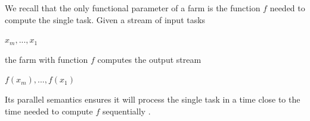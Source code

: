 


We recall that the only functional parameter of a farm is the function \(f\) needed to compute the single task.
Given a stream of input tasks
\begin{center}
	\(x_m , . . . , x_1\)\\
\end{center}
the farm with function \(f\) computes the output stream
\begin{center}
	\(f ( x_m ), . . . , f ( x_1 )\)\\
\end{center}
Its parallel semantics ensures it will process the single task in a time close to the time needed to compute \(f\) sequentially \cite{spm}. %


